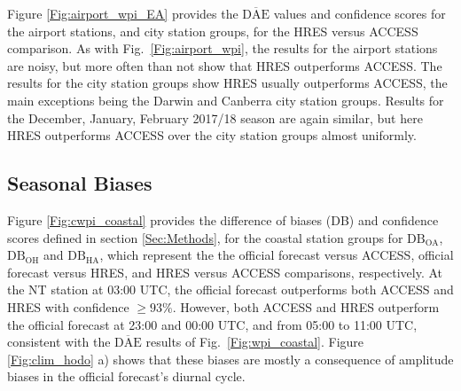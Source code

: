 \documentclass[twocol]{ametsoc}
\begin{document}

Figure \ref{Fig:airport_wpi_EA} provides the $\overline{\text{DAE}}$ values and confidence scores for the airport stations, and city station groups, for the HRES versus ACCESS comparison. As with Fig.~\ref{Fig:airport_wpi}, the results for the airport stations are noisy, but more often than not show that HRES outperforms ACCESS. The results for the city station groups show HRES usually outperforms ACCESS, the main exceptions being the Darwin and Canberra city station groups. Results for the December, January, February 2017/18 season are again similar, but here HRES outperforms ACCESS over the city station groups almost uniformly. 

\subsection{Seasonal Biases}
\label{Sec:Seasonal}
Figure \ref{Fig:cwpi_coastal} provides the difference of biases (DB) and confidence scores defined in section \ref{Sec:Methods}, for the coastal station groups for $\text{DB}_\text{OA}$, $\text{DB}_\text{OH}$ and $\text{DB}_\text{HA}$, which represent the the official forecast versus ACCESS, official forecast versus HRES, and HRES versus ACCESS comparisons, respectively. At the NT station at 03:00 UTC, the official forecast outperforms both ACCESS and HRES with confidence $\geq 93\%$. However, both ACCESS and HRES outperform the official forecast at 23:00 and 00:00 UTC, and from 05:00 to 11:00 UTC, consistent with the $\overline{\text{DAE}}$ results of Fig.~\ref{Fig:wpi_coastal}. Figure \ref{Fig:clim_hodo} a) shows that these biases are mostly a consequence of amplitude biases in the official forecast's diurnal cycle.
\end{document}
